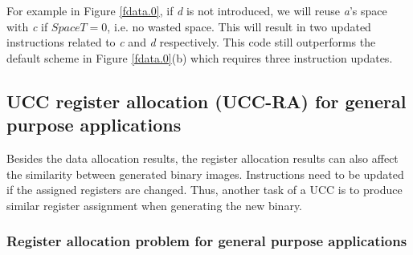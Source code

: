 For example in Figure \ref{fdata.0}, if {\it d} is not introduced, we
will reuse {\it a}'s space with {\it c} if $SpaceT=0$, i.e. no wasted
space. This will result in two updated instructions related to
 {\it c} and {\it d} respectively. This code still outperforms
the default scheme in Figure \ref{fdata.0}(b) which requires three
instruction updates.



\subsection{UCC register allocation (UCC-RA) for general purpose applications}
Besides the data allocation results, the register allocation results can also 
affect the similarity between generated binary images.
Instructions need to be updated if the assigned registers are changed.
Thus, another task of a UCC is to produce similar register assignment
when generating the new binary.

\subsubsection{Register allocation problem for general purpose applications} 
%

